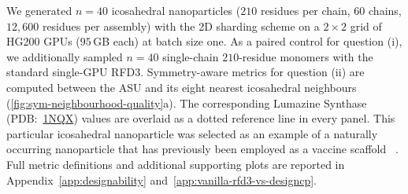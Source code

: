 \documentclass{article}
\theoremstyle{plain}
\theoremstyle{definition}
\theoremstyle{remark}
\begin{document}
We generated $n=40$ icosahedral nanoparticles ($210$ residues per chain, $60$ chains, $12{,}600$ residues per assembly) with the 2D sharding scheme on a $2\times 2$ grid of HG200 GPUs ($95$\,GB each) at batch size one. As a paired control for question (i), we additionally sampled $n=40$ single-chain $210$-residue monomers with the standard single-GPU RFD3. Symmetry-aware metrics for question (ii) are computed between the ASU and its eight nearest icosahedral neighbours (\cref{fig:sym-neighbourhood-quality}a). The corresponding Lumazine Synthase (PDB:~\href{https://www.rcsb.org/structure/1NQX}{1NQX}) values are overlaid as a dotted reference line in every panel. This particular icosahedral nanoparticle was selected as an example of a naturally occurring nanoparticle that has previously been employed as a vaccine scaffold ~\cite{ladenstein_second_2020, joseph_lumazine_2025}. Full metric definitions and additional supporting plots are reported in Appendix~\ref{app:designability} and~\ref{app:vanilla-rfd3-vs-designcp}.
\end{document}

